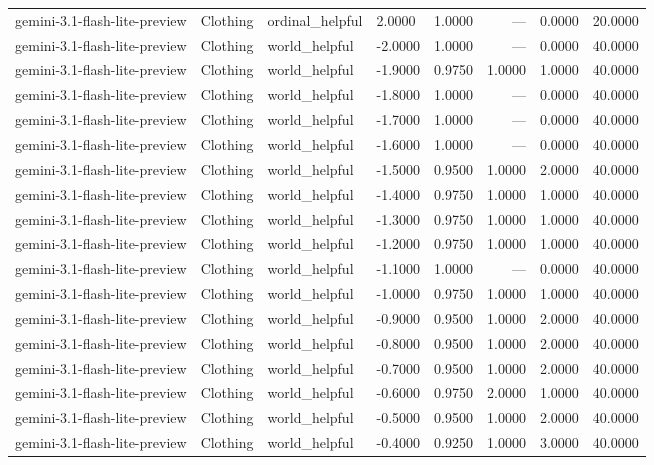 \begin{table}
\begin{tabular}{llllrrrr}
gemini-3.1-flash-lite-preview & Clothing & ordinal_helpful & 2.0000 & 1.0000 & --- & 0.0000 & 20.0000 \\
gemini-3.1-flash-lite-preview & Clothing & world_helpful & -2.0000 & 1.0000 & --- & 0.0000 & 40.0000 \\
gemini-3.1-flash-lite-preview & Clothing & world_helpful & -1.9000 & 0.9750 & 1.0000 & 1.0000 & 40.0000 \\
gemini-3.1-flash-lite-preview & Clothing & world_helpful & -1.8000 & 1.0000 & --- & 0.0000 & 40.0000 \\
gemini-3.1-flash-lite-preview & Clothing & world_helpful & -1.7000 & 1.0000 & --- & 0.0000 & 40.0000 \\
gemini-3.1-flash-lite-preview & Clothing & world_helpful & -1.6000 & 1.0000 & --- & 0.0000 & 40.0000 \\
gemini-3.1-flash-lite-preview & Clothing & world_helpful & -1.5000 & 0.9500 & 1.0000 & 2.0000 & 40.0000 \\
gemini-3.1-flash-lite-preview & Clothing & world_helpful & -1.4000 & 0.9750 & 1.0000 & 1.0000 & 40.0000 \\
gemini-3.1-flash-lite-preview & Clothing & world_helpful & -1.3000 & 0.9750 & 1.0000 & 1.0000 & 40.0000 \\
gemini-3.1-flash-lite-preview & Clothing & world_helpful & -1.2000 & 0.9750 & 1.0000 & 1.0000 & 40.0000 \\
gemini-3.1-flash-lite-preview & Clothing & world_helpful & -1.1000 & 1.0000 & --- & 0.0000 & 40.0000 \\
gemini-3.1-flash-lite-preview & Clothing & world_helpful & -1.0000 & 0.9750 & 1.0000 & 1.0000 & 40.0000 \\
gemini-3.1-flash-lite-preview & Clothing & world_helpful & -0.9000 & 0.9500 & 1.0000 & 2.0000 & 40.0000 \\
gemini-3.1-flash-lite-preview & Clothing & world_helpful & -0.8000 & 0.9500 & 1.0000 & 2.0000 & 40.0000 \\
gemini-3.1-flash-lite-preview & Clothing & world_helpful & -0.7000 & 0.9500 & 1.0000 & 2.0000 & 40.0000 \\
gemini-3.1-flash-lite-preview & Clothing & world_helpful & -0.6000 & 0.9750 & 2.0000 & 1.0000 & 40.0000 \\
gemini-3.1-flash-lite-preview & Clothing & world_helpful & -0.5000 & 0.9500 & 1.0000 & 2.0000 & 40.0000 \\
gemini-3.1-flash-lite-preview & Clothing & world_helpful & -0.4000 & 0.9250 & 1.0000 & 3.0000 & 40.0000 \\

\end{tabular}
\end{table}
